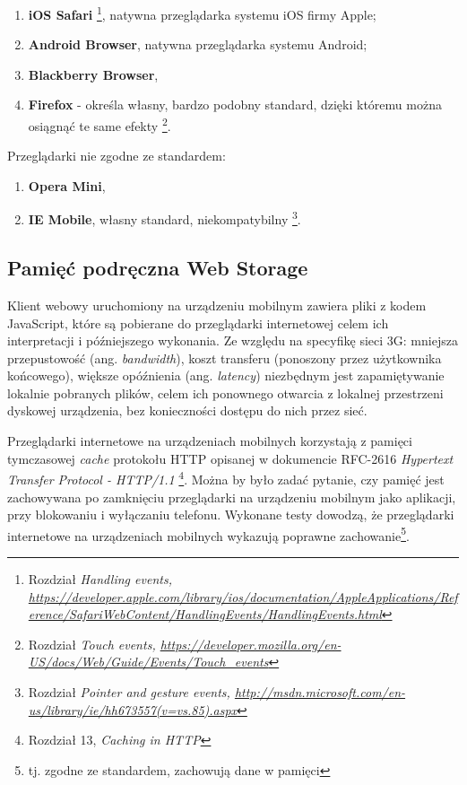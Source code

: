 \begin{enumerate}
  \item \textbf{iOS Safari}\cite{browser-ios-safari} \footnote{\cite{browser-ios-safari} Rozdział \em{Handling events}, \url{https://developer.apple.com/library/ios/documentation/AppleApplications/Reference/SafariWebContent/HandlingEvents/HandlingEvents.html}}, natywna przeglądarka systemu iOS firmy Apple;
  \item \textbf{Android Browser}, natywna przeglądarka systemu Android;
  \item \textbf{Blackberry Browser},
  \item \textbf{Firefox} - określa własny, bardzo podobny standard, dzięki któremu można osiągnąć te same efekty\cite{browser-firefox} \footnote{\cite{browser-firefox} Rozdział \em{Touch events}, \url{https://developer.mozilla.org/en-US/docs/Web/Guide/Events/Touch_events}}.
\end{enumerate}

Przeglądarki nie zgodne ze standardem:

\begin{enumerate}
  \item \textbf{Opera Mini},
  \item \textbf{IE Mobile}, własny standard, niekompatybilny\cite{browser-ie} \footnote{\cite{browser-ie} Rozdział \em{Pointer and gesture events}, \url{http://msdn.microsoft.com/en-us/library/ie/hh673557(v=vs.85).aspx}}.
\end{enumerate}

\subsection{Pamięć podręczna Web Storage}
\label{subsub:webstorage}

Klient webowy uruchomiony na urządzeniu mobilnym zawiera pliki z kodem JavaScript, które są pobierane do przeglądarki internetowej celem ich interpretacji i późniejszego wykonania. Ze względu na specyfikę sieci 3G: mniejsza przepustowość (ang. \emph{bandwidth}), koszt transferu (ponoszony przez użytkownika końcowego), większe opóźnienia (ang. \emph{latency}) niezbędnym jest zapamiętywanie lokalnie pobranych plików, celem ich ponownego otwarcia z lokalnej przestrzeni dyskowej urządzenia, bez konieczności dostępu do nich przez sieć.

Przeglądarki internetowe na urządzeniach mobilnych korzystają z pamięci tymczasowej \emph{cache} protokołu HTTP opisanej w dokumencie RFC-2616 \emph{Hypertext Transfer Protocol - HTTP/1.1}\cite{http-rfc} \footnote{Rozdział 13, \emph{Caching in HTTP}}. Można by było zadać pytanie, czy pamięć jest zachowywana po zamknięciu przeglądarki na urządzeniu mobilnym jako aplikacji, przy blokowaniu i wyłączaniu telefonu. Wykonane testy dowodzą, że przeglądarki internetowe na urządzeniach mobilnych wykazują poprawne zachowanie\cite{http-cache-mobile-benchmark}\footnote{tj. zgodne ze standardem, zachowują dane w pamięci}.

